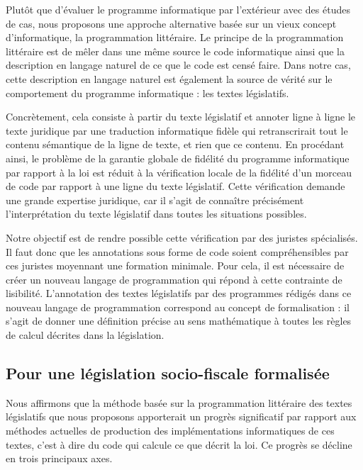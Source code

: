 \documentclass[12pt, french]{article}
\begin{document}
Plutôt que d'évaluer le programme informatique par l'extérieur avec des études de cas, nous proposons une approche alternative basée sur un vieux concept d'informatique, la programmation littéraire. Le principe de la programmation littéraire est de mêler dans une même source le code informatique ainsi que la description en langage naturel de ce que le code est censé faire. Dans notre cas, cette description en langage naturel est également la source de vérité sur le comportement du programme informatique : les textes législatifs.

Concrètement, cela consiste à partir du texte législatif et annoter ligne à ligne le texte juridique par une traduction informatique fidèle qui retranscrirait tout le contenu sémantique de la ligne de texte, et rien que ce contenu. En procédant ainsi, le problème de la garantie globale de fidélité du programme informatique par rapport à la loi est réduit à la vérification locale de la fidélité d'un morceau de code par rapport à une ligne du texte législatif. Cette vérification demande une grande expertise juridique, car il s'agit de connaître précisément l'interprétation du texte législatif dans toutes les situations possibles.

Notre objectif est de rendre possible cette vérification par des juristes spécialisés. Il faut donc que les annotations sous forme de code soient compréhensibles par ces juristes moyennant une formation minimale. Pour cela, il est nécessaire de créer un nouveau langage de programmation qui répond à cette contrainte de lisibilité. L'annotation des textes législatifs par des programmes rédigés dans ce nouveau langage de programmation correspond au concept de formalisation : il s'agit de donner une définition précise au sens mathématique à toutes les règles de calcul décrites dans la législation.

\subsection{Pour une législation socio-fiscale formalisée}

Nous affirmons que la méthode basée sur la programmation littéraire des textes législatifs que nous proposons apporterait un progrès significatif par rapport aux méthodes actuelles de production des implémentations informatiques de ces textes, c'est à dire du code qui calcule ce que décrit la loi. Ce progrès se décline en trois principaux axes.
\end{document}
